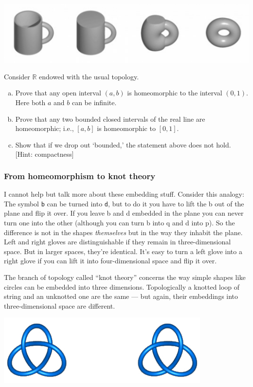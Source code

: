 \includegraphics[width=\textwidth]{cup.jpg}

\begin{qst} Consider $\mathbb R$ endowed with the usual topology.
  \begin{enumerate}[(a)]
    \item Prove that any open interval $(a,b)$ is homeomorphic to the interval $(0,1)$. Here both $a$ and $b$ can be infinite. 
    \item Prove that any two bounded closed intervals of the real line are homeomorphic; i.e., $[a,b]$ is homeomorphic to $[0,1]$.  
    \item Show that if we drop out `bounded,' the statement above does not hold. [Hint: compactness]
  \end{enumerate}
\end{qst}



\subsubsection{From homeomorphism to knot theory}

I cannot help but talk more about these embedding stuff.
Consider this analogy: The symbol \texttt{b} can be turned into \texttt{d}, 
but to do it you have to lift the b out of the plane and flip it over. If you leave b and d embedded in the plane you can never turn one into the other (although you can turn b into q and d into p). 
So the difference is not in the shapes \textit{themselves}
but in the way they inhabit the plane.
Left and right gloves are distinguishable if they remain in three-dimensional space.
But in larger spaces, they're identical. It's easy to turn a left glove into a right glove if you can lift it into four-dimensional space and flip it over.

The branch of topology called ``knot theory'' concerns the way simple shapes like circles can be embedded into three dimensions.
Topologically a knotted loop of string and an unknotted one are the same --- but again, their embeddings into three-dimensional space are different. 

\includegraphics[width=0.8\textwidth]{knots}


